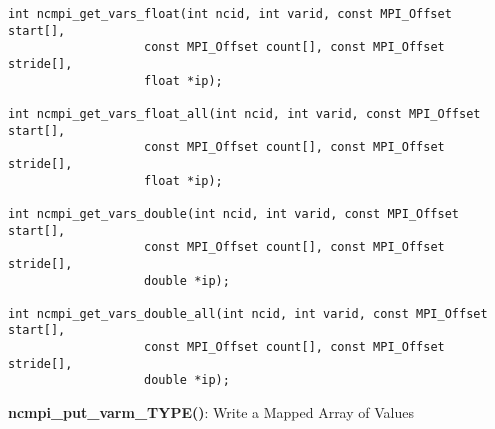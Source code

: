 \begin{verbatim}
int ncmpi_get_vars_float(int ncid, int varid, const MPI_Offset start[],
                   const MPI_Offset count[], const MPI_Offset stride[],
                   float *ip); 

int ncmpi_get_vars_float_all(int ncid, int varid, const MPI_Offset start[],
                   const MPI_Offset count[], const MPI_Offset stride[],
                   float *ip); 

int ncmpi_get_vars_double(int ncid, int varid, const MPI_Offset start[],
                   const MPI_Offset count[], const MPI_Offset stride[],
                   double *ip);

int ncmpi_get_vars_double_all(int ncid, int varid, const MPI_Offset start[],
                   const MPI_Offset count[], const MPI_Offset stride[],
                   double *ip); 
\end{verbatim}


{\bf ncmpi\_put\_varm\_TYPE()}: Write a Mapped Array of Values


